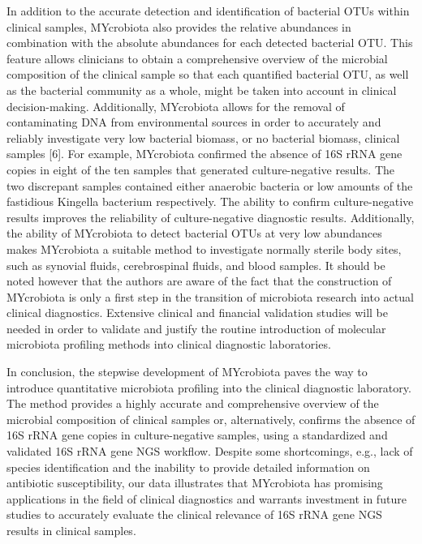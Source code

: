 In addition to the accurate detection and identification of bacterial OTUs within clinical samples, MYcrobiota also provides the relative
abundances in combination with the absolute abundances for each detected bacterial OTU. This feature allows clinicians to obtain a comprehensive
overview of the microbial composition of the clinical sample so that each quantified bacterial OTU, as well as the bacterial community as a whole,
might be taken into account in clinical decision-making. Additionally, MYcrobiota allows for the removal of contaminating DNA from environmental
sources in order to accurately and reliably investigate very low bacterial biomass, or no bacterial biomass, clinical samples [6]. For example,
MYcrobiota confirmed the absence of 16S rRNA gene copies in eight of the ten samples that generated culture-negative results. The two discrepant
samples contained either anaerobic bacteria or low amounts of the fastidious Kingella bacterium respectively. The ability to confirm culture-negative
results improves the reliability of culture-negative diagnostic results. Additionally, the ability of MYcrobiota to detect bacterial OTUs at very low
abundances makes MYcrobiota a suitable method to investigate normally sterile body sites, such as synovial fluids, cerebrospinal fluids, and blood samples.
It should be noted however that the authors are aware of the fact that the construction of MYcrobiota is only a first step in the transition of microbiota
research into actual clinical diagnostics. Extensive clinical and financial validation studies will be needed in order to validate and justify the routine
introduction of molecular microbiota profiling methods into clinical diagnostic laboratories.

In conclusion, the stepwise development of MYcrobiota paves the way to introduce quantitative microbiota profiling into the clinical diagnostic
laboratory. The method provides a highly accurate and comprehensive overview of the microbial composition of clinical samples or, alternatively,
confirms the absence of 16S rRNA gene copies in culture-negative samples, using a standardized and validated 16S rRNA gene NGS workflow. Despite
some shortcomings, e.g., lack of species identification and the inability to provide detailed information on antibiotic susceptibility, our data
illustrates that MYcrobiota has promising applications in the field of clinical diagnostics and warrants investment in future studies to accurately
evaluate the clinical relevance of 16S rRNA gene NGS results in clinical samples.


